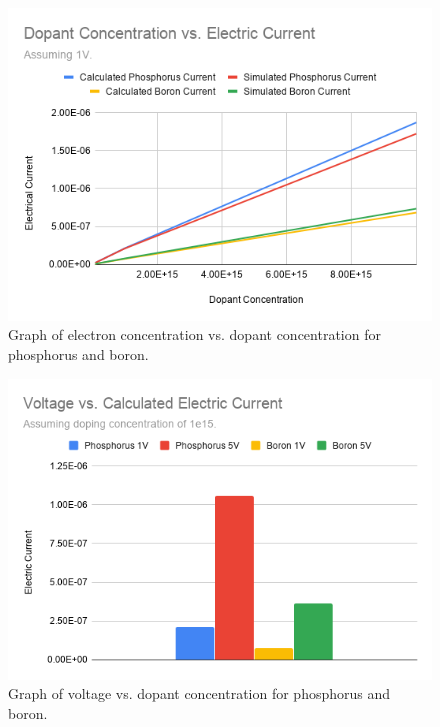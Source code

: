 \documentclass[12pt]{article}
\begin{document}
\begin{figure}[ht]
  \centering
  \includegraphics[width=\textwidth]{concvcurrent}
  \caption{Graph of electron concentration vs. dopant concentration for phosphorus and boron.}
  \label{fig:concvcurrent}
\end{figure}

\begin{figure}[ht]
  \centering
  \includegraphics[width=\textwidth]{voltvcurrent}
  \caption{Graph of voltage vs. dopant concentration for phosphorus and boron.}
  \label{fig:voltvcurrent}
\end{figure}



\end{document}
